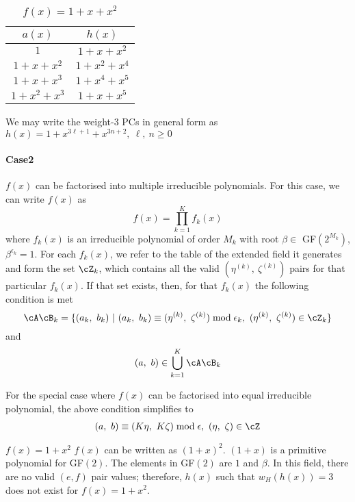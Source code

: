 \begin{table}[htbp]
	\caption{$f(x)=1+x+x^2$}
	\centering
	\begin{tabular}{c c} 
		\hline
		$a(x)$ & $h(x)$\\ [0.5ex] 
		\hline\hline
		$1$ & $1+x+x^2$\\ 
		\hline
		$1+x+x^2$ &  $1+x^2+x^4$\\
		\hline
		$1+x+x^3$ & $1+x^4+x^5$\\
		\hline
		$1+x^2+x^3$ & $1+x+x^5$ 
	\end{tabular}
	\label{novelTab8}
\end{table}

We may write the weight-3 PCs in general form as $h(x)=1+x^{3\ell+1}+x^{3n+2},~\ell,~n \geq 0$ 



\paragraph{Case2}$f(x)$ can be factorised into multiple irreducible polynomials. \newline
For this case, we can write $f(x)$ as $$f(x)=\prod_{k=1}^{K}f_k(x)$$ where $f_k(x)$ is an irreducible polynomial of order $M_k$ with root $\beta \in $ GF$(2^{M_k})$, $\beta^{\epsilon_k}=1$. 
For each $f_k(x)$, we refer to the table of the extended field it generates and form the set $\cZ_k$, which contains all the valid $(\eta^{(k)},~\zeta^{(k)})$ pairs for that particular $f_k(x)$. If that set exists, then, for that $f_k(x)$ the following condition is met
\begin{equation}
\cA\cB_k=\{(a_k,~b_k)~|~(a_k,~b_k) \equiv (\eta^{(k)},~\zeta^{(k)}) \bmod \epsilon_k,~(\eta^{(k)},~\zeta^{(k)})\in \cZ_k\}
\end{equation}
and 
\begin{equation}
(a,~b) \in \bigcup_{k=1}^{K} \cA\cB_k
\end{equation}

For the special case where $f(x)$ can be factorised into equal irreducible polynomial, the above condition simplifies to 
\begin{equation*}
\begin{split}
&(a,~b) \equiv (K\eta,~K\zeta) \bmod \epsilon,~(\eta,~\zeta) \in \cZ \\
\end{split}
\end{equation*}

\begin{example}
	$f(x)=1+x^2$ \newline $f(x)$ can be written as $(1+x)^2$. $(1+x)$ is a primitive polynomial for GF$(2)$. The elements in GF$(2)$ are $1$ and $\beta$. In this field,  there are no valid $(e,f)$ pair values; therefore, $h(x)$ such that  $w_H(h(x))=3$ does not exist for $f(x)=1+x^2$.
	\label{ex-6}
\end{example}








